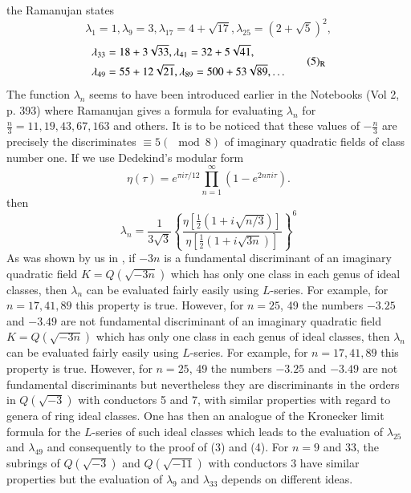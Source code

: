 the Ramanujan states
$$
\lambda_{1}=1, \lambda_{9}=3, \lambda_{17}=4+\sqrt{17}, \lambda_{25}=(2+\sqrt{5})^{2},
$$
\begin{equation*}
\begin{aligned}
\lambda_{33} &= 18+3\sqrt{33}, \lambda_{41}=32+5\sqrt{41},\\
\lambda_{49} &= 55+12\sqrt{21}, \lambda_{89}=500+53\sqrt{89},\ldots
\end{aligned}\tag*{(5)$_{\text{R}}$}
\end{equation*}\pageoriginale
The function $\lambda_{n}$ seems to have been introduced earlier in the Notebooks (Vol 2, p. 393) where Ramanujan gives a formula for evaluating $\lambda_{n}$ for $\frac{n}{3}=11,19,43,67,163$ and others. It is to be noticed that these values of $-\frac{n}{3}$ are precisely the discriminates $\equiv 5(\mod 8)$ of imaginary quadratic fields of class number one. If we use Dedekind's modular form
$$
\eta(\tau)=e^{\pi i\tau/12}\prod\limits^{\infty}_{n=1}(1-e^{2n\pi i\tau}).
$$
then
\setcounter{equation}{5}
\begin{equation}
\lambda_{n}=\frac{1}{3\sqrt{3}}\left\{\frac{\eta[\frac{1}{2}(1+i\sqrt{n/3})]}{\eta[\frac{1}{2}(1+i\sqrt{3n})]}\right\}^{6}\label{art09-eq6}
\end{equation}
As was shown by us in \cite{art09-key5}, if $-3n$ is a fundamental discriminant of an imaginary quadratic field $K=Q(\sqrt{-3n})$ which has only one class in each genus of ideal classes, then $\lambda_{n}$ can be evaluated fairly easily using $L$-series. For example, for $n=17,41,89$ this property is true. However, for $n=25$, 49 the numbers $-3.25$ and $-3.49$ are not fundamental discriminant of an imaginary quadratic field $K=Q(\sqrt{-3n})$ which has only one class in each genus of ideal classes, then $\lambda_{n}$ can be evaluated fairly easily using $L$-series. For example, for $n=17,41,89$ this property is true. However, for $n=25$, 49 the numbers $-3.25$ and $-3.49$ are not fundamental discriminants but nevertheless they are discriminants in the orders in $Q(\sqrt{-3})$ with conductors 5 and 7, with similar properties with regard to genera of ring ideal classes. One has then an analogue of the Kronecker limit formula for the $L$-series of such ideal classes which leads to the evaluation of $\lambda_{25}$ and $\lambda_{49}$ and consequently to the proof of (3) and (4). For $n=9$ and $33$, the subrings of $Q(\sqrt{-3})$ and $Q(\sqrt{-11})$ with conductors $3$ have similar properties but the evaluation of $\lambda_{9}$ and $\lambda_{33}$ depends on different ideas.

